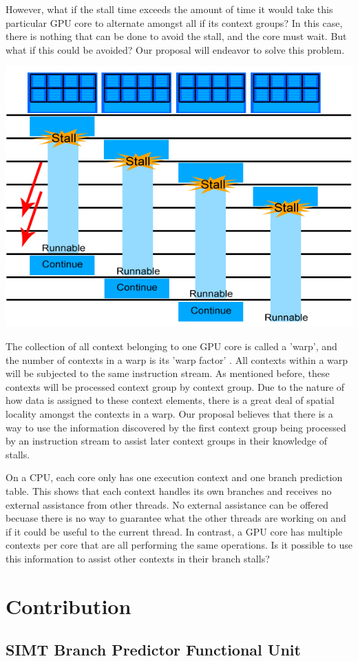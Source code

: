 \documentclass[conference]{IEEEtran}
\begin{document}
However, what if the stall time exceeds the amount of time it would take this particular GPU core to alternate amongst all if its context groups?  In this case, there is nothing that can be done to avoid the stall, and the core must wait.  But what if this could be avoided?  Our proposal will endeavor to solve this problem.
\begin{center}
	\includegraphics[width=.45\textwidth]{GPU-context-interleaving-2.jpg}
\end{center}

The collection of all context belonging to one GPU core is called a 'warp', and the number of contexts in a warp is  its 'warp factor' \cite{Luebke08}.  All contexts within a warp will be subjected to the same instruction stream.  As mentioned before, these contexts will be processed context group by context group.  Due to the nature of how data is assigned to these context elements, there is a great deal of spatial locality amongst the contexts in a warp.  Our proposal believes that there is a way to use the information discovered by the first context group being processed by an instruction stream to assist later context groups in their knowledge of stalls.

On a CPU, each core only has one execution context and one branch prediction table.  This shows that each context handles its own branches and receives no external assistance from other threads.  No external assistance can be offered becuase there is no way to guarantee what the other threads are working on and if it could be useful to the current thread.  In contrast, a GPU core has multiple contexts per core that are all performing the same operations.  Is it possible to use this information to assist other contexts in their branch stalls?

\section{Contribution}

\subsection{SIMT Branch Predictor Functional Unit}
\end{document}
